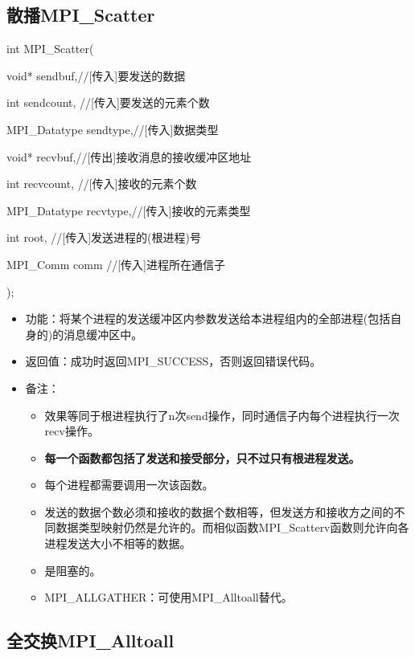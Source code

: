 \documentclass[UTF8]{article}%
\begin{document}
\subsection{散播MPI\_Scatter}

int MPI\_Scatter(
    
    \qquad void* sendbuf,//[传入]要发送的数据

    \qquad int sendcount, //[传入]要发送的元素个数

    \qquad MPI\_Datatype sendtype,//[传入]数据类型

    \qquad void* recvbuf,//[传出]接收消息的接收缓冲区地址

    \qquad int recvcount, //[传入]接收的元素个数

    \qquad MPI\_Datatype recvtype,//[传入]接收的元素类型
                
    \qquad int root, //[传入]发送进程的(根进程)号
    
    \qquad MPI\_Comm comm //[传入]进程所在通信子
    
);

\begin{itemize}
    \item 功能：将某个进程的发送缓冲区内参数发送给本进程组内的全部进程(包括自身的)的消息缓冲区中。
    \item 返回值：成功时返回MPI\_SUCCESS，否则返回错误代码。
    \item 备注：
    
    {
        \begin{itemize}
            \item 效果等同于根进程执行了n次send操作，同时通信子内每个进程执行一次recv操作。
            \item \textbf{每一个函数都包括了发送和接受部分，只不过只有根进程发送。}
            \item 每个进程都需要调用一次该函数。
            \item 发送的数据个数必须和接收的数据个数相等，但发送方和接收方之间的不同数据类型映射仍然是允许的。而相似函数MPI\_Scatterv函数则允许向各进程发送大小不相等的数据。
            \item 是阻塞的。
            \item MPI\_ALLGATHER：可使用MPI\_Alltoall替代。
        \end{itemize}
    }

\end{itemize}

\subsection{全交换MPI\_Alltoall}
\end{document}
